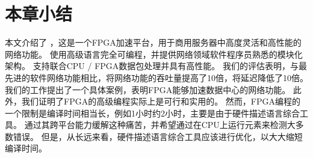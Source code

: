 \section{本章小结}
\label{clicknp:sec:conclusion}

本文介绍了 \name ，这是一个FPGA加速平台，用于商用服务器中高度灵活和高性能的网络功能。
\name 使用高级语言完全可编程，并提供网络领域软件程序员熟悉的模块化架构。
\name 支持联合CPU / FPGA数据包处理并具有高性能。
我们的评估表明，与最先进的软件网络功能相比，\name 将网络功能的吞吐量提高了10倍，将延迟降低了10倍。
我们的工作提出了一个具体案例，表明FPGA能够加速数据中心的网络功能。
此外，我们证明了FPGA的高级编程实际上是可行和实用的。
然而，FPGA编程的一个限制是编译时间相当长，例如1小时约2小时，主要是由于硬件描述语言综合工具。
\name 通过其跨平台能力缓解这种痛苦，并希望通过在CPU上运行元素来检测大多数错误。
但是，从长远来看，硬件描述语言综合工具应该进行优化，以大大缩短编译时间。





